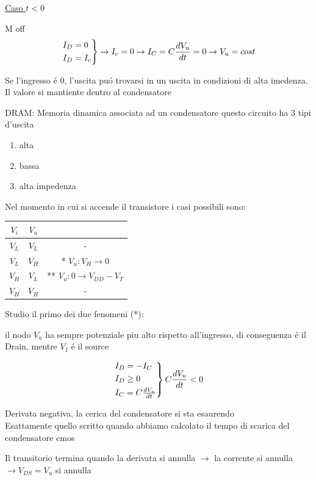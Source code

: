 \documentclass{article}
\begin{document}
\underline{Caso $t < 0$}

M off
\[
    \begin{rcases}
         I_D = 0\\
         I_D = I_c
     \end{rcases} \rightarrow I_c = 0 \rightarrow I_C = C\frac{dV_u}{dt} = 0 \rightarrow V_u = cost
\]

 Se l'ingresso \'e 0, l'uscita pu\'o trovarsi in un uscita in condizioni di alta imedenza.
Il valore si mantiente dentro al condensatore

DRAM: Memoria dinamica associata ad un condensatore
questo circuito ha 3 tipi d'uscita

\begin{enumerate}
    \item alta
    \item bassa
    \item alta impedenza
\end{enumerate}

Nel momento in cui si accende il transistore i casi possibili sono:

\begin{tabular}{c c c}
    $V_i$ & $V_u$ \\
    \hline
    $V_L$ & $V_L$ & -\\
    $V_L$ & $V_H$ & * $V_u : V_H\to 0$\\
    $V_H$ & $V_L$ & ** $V_u: 0 \to V_{DD} - V_T$\\
    $V_H$ & $V_H$ & -\\
\end{tabular}

Studio il primo dei due fenomeni (*):

il nodo $V_u$ ha sempre potenziale piu alto rispetto all'ingresso, di conseguenza \'e il Drain, mentre $V_I$ \'e il source

\[
    \begin{rcases}
        I_D = - I_C\\
        I_D \ge 0\\
        I_C = C\frac{dV_u}{dt}
    \end{rcases}
    C\frac{dV_u}{dt} < 0
\]

Derivata negativa, la cerica del condensatore si sta esaurendo\\
Esattamente quello scritto quando abbiamo calcolato il tempo di scarica del condensatore cmos

Il transitorio termina quando la derivata si annulla $\rightarrow$ la corrente si annulla $\rightarrow V_{DS} = V_u$ si annulla
\end{document}
